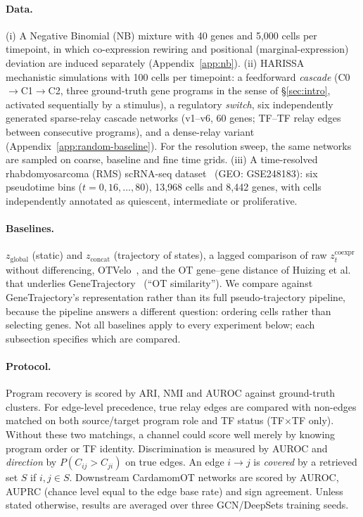 \documentclass[10pt, letterpaper]{article}
\DeclareRobustCommand{\eliasadds}[1]{{\color{red}#1}}
\newcommand{\zco}{z^{\mathrm{coexpr}}}
\begin{document}
\paragraph{Data.}

(i) A Negative Binomial (NB) mixture with 40 genes and 5{,}000 cells per timepoint, in which co-expression rewiring and positional (marginal-expression) deviation are induced separately (Appendix~\ref{app:nb}). (ii) HARISSA~\cite{herbach2023harissa} mechanistic simulations with 100 cells per timepoint: a feedforward \emph{cascade} (C0$\to$C1$\to$C2, three ground-truth gene programs in the sense of \S\ref{sec:intro}, activated sequentially by a stimulus), a regulatory \emph{switch}, six independently generated sparse-relay cascade networks (v1--v6, 60 genes; TF--TF relay edges between consecutive programs), and a dense-relay variant (Appendix~\ref{app:random-baseline}). For the resolution sweep, the same networks are sampled on coarse, baseline and fine time grids.\eliasadds{ }(iii) A time-resolved rhabdomyosarcoma (RMS) scRNA-seq dataset~\cite{savary2023organoids} (GEO: GSE248183): six pseudotime bins ($t=0,16,\dots,80$), 13,968 cells and 8,442 genes, with cells independently annotated as quiescent, intermediate or proliferative.


\paragraph{Baselines.} $z_{\mathrm{global}}$ (static) and $z_{\mathrm{concat}}$ (trajectory of states), a lagged comparison of raw $\zco_t$ without differencing, OTVelo~\cite{zhao2025otvelo}, and the OT gene--gene distance of Huizing et al.~\cite{huizing2022ot} that underlies GeneTrajectory~\cite{qu2025genetrajectory} (``OT similarity''). We compare against GeneTrajectory's representation rather than its full pseudo-trajectory pipeline, because the pipeline answers a different question: ordering cells rather than selecting genes. Not all baselines apply to every experiment below; each subsection specifies which are compared.

\paragraph{Protocol.} Program recovery is scored by ARI, NMI and AUROC against ground-truth clusters. For edge-level precedence, true relay edges are compared with non-edges matched on both source/target program role and TF status (TF$\times$TF only). Without these two matchings, a channel could score well merely by knowing program order or TF identity. Discrimination is measured by AUROC and \emph{direction} by $P(C_{ij}>C_{ji})$ on true edges. An edge $i\to j$ is \emph{covered} by a retrieved set $S$ if $i,j\in S$. Downstream CardamomOT networks are scored by AUROC, AUPRC (chance level equal to the edge base rate) and sign agreement. Unless stated otherwise, results are averaged over three GCN/DeepSets training seeds.
\end{document}
